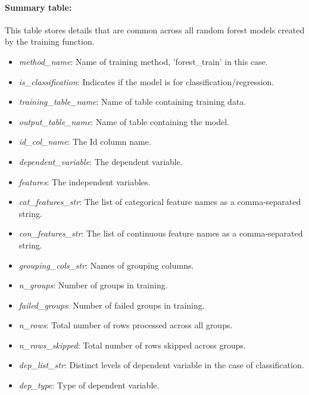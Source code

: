 \paragraph{Summary table:}
This table stores details that are common across all random forest models created by the
training function.
\begin{itemize}
    \item \emph{method\_name}: Name of training method, 'forest\_train' in this case.
    \item \emph{is\_classification}: Indicates if the model is for classification/regression.
    \item \emph{training\_table\_name}: Name of table containing training data.
    \item \emph{output\_table\_name}: Name of table containing the model.
    \item \emph{id\_col\_name}: The Id column name.
    \item \emph{dependent\_variable}: The dependent variable.
    \item \emph{features}: The independent variables.
    \item \emph{cat\_features\_str}: The list of categorical feature names as a comma-separated string.
    \item \emph{con\_features\_str}: The list of continuous feature names as a comma-separated string.
    \item \emph{grouping\_cols\_str}: Names of grouping columns.
    \item \emph{n\_groups}: Number of groups in training.
    \item \emph{failed\_groups}: Number of failed groups in training.
    \item \emph{n\_rows}: Total number of rows processed across all groups.
    \item \emph{n\_rows\_skipped}: Total number of rows skipped across groups.
    \item \emph{dep\_list\_str}: Distinct levels of dependent variable in the case of classification.
    \item \emph{dep\_type}: Type of dependent variable.
\end{itemize}

